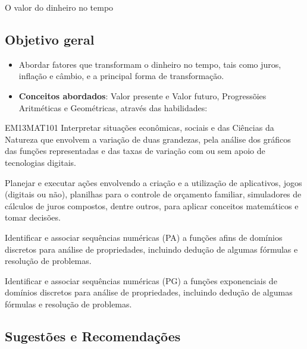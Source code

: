\begin{paginatexto}{O valor do dinheiro no tempo}\raggedcolumns

\subsection*{Objetivo geral}

\begin{itemize}
\item Abordar fatores que transformam o dinheiro no tempo, tais como juros, inflação e câmbio, e a principal forma de transformação.

\item \textbf{Conceitos abordados}: Valor presente e Valor futuro, Progressõies Aritméticas e Geométricas, através das habilidades:
\end{itemize}

\begin{habilities}{EM13MAT101}
 Interpretar situações econômicas, sociais e das Ciências da Natureza
que envolvem a variação de duas grandezas, pela análise dos gráficos das funções representadas e das taxas de variação com ou sem apoio de tecnologias digitais.

Planejar e executar ações envolvendo a criação e a utilização de aplicativos, jogos (digitais ou não), planilhas para o controle de orçamento familiar, simuladores de cálculos de juros compostos, dentre outros, para aplicar conceitos matemáticos e tomar decisões. 

Identificar e associar sequências numéricas (PA) a funções afins de domínios discretos para análise de propriedades, incluindo dedução de algumas fórmulas e resolução de problemas.

Identificar e associar sequências numéricas (PG) a funções exponenciais de domínios discretos para análise de propriedades, incluindo dedução de algumas fórmulas e resolução de problemas.
\end{habilities}

\subsection*{Sugestões e Recomendações}

\end{paginatexto}
